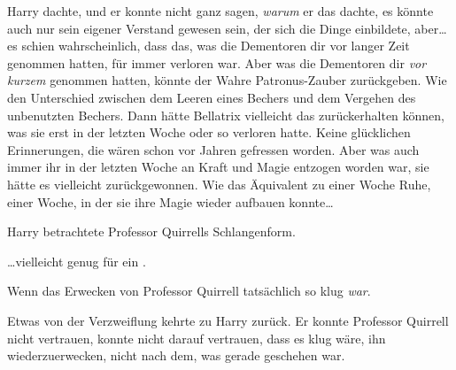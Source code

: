 Harry dachte, und er konnte nicht ganz sagen, \emph{warum} er das dachte, es könnte auch nur sein eigener Verstand gewesen sein, der sich die Dinge einbildete, aber…es schien wahrscheinlich, dass das, was die Dementoren dir vor langer Zeit genommen hatten, für immer verloren war. Aber was die Dementoren dir \emph{vor kurzem} genommen hatten, könnte der Wahre Patronus-Zauber zurückgeben. Wie den Unterschied zwischen dem Leeren eines Bechers und dem Vergehen des unbenutzten Bechers. Dann hätte Bellatrix vielleicht das zurückerhalten können, was sie erst in der letzten Woche oder so verloren hatte. Keine glücklichen Erinnerungen, die wären schon vor Jahren gefressen worden. Aber was auch immer ihr in der letzten Woche an Kraft und Magie entzogen worden war, sie hätte es vielleicht zurückgewonnen. Wie das Äquivalent zu einer Woche Ruhe, einer Woche, in der sie ihre Magie wieder aufbauen konnte…

Harry betrachtete Professor Quirrells Schlangenform.

…vielleicht genug für ein .%

Wenn das Erwecken von Professor Quirrell tatsächlich so klug \emph{war}.

Etwas von der Verzweiflung kehrte zu Harry zurück. Er konnte Professor Quirrell nicht vertrauen, konnte nicht darauf vertrauen, dass es klug wäre, ihn wiederzuerwecken, nicht nach dem, was gerade geschehen war.

